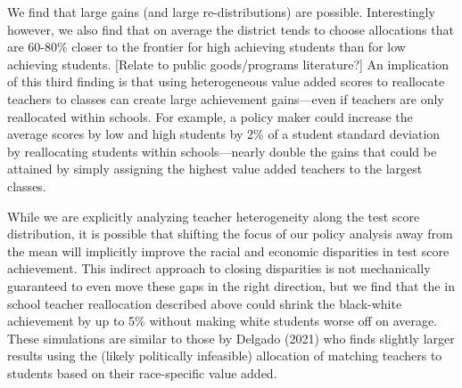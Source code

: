 \documentclass[letterpaper,12pt]{article}
\begin{document}
We find that large gains (and large re-distributions) are possible. Interestingly however, we also find that on average the district tends to choose allocations that are 60-80\% closer to the frontier for high achieving students than for low achieving students. [Relate to public goods/programs literature?] An implication of this third finding is that using heterogeneous value added scores to reallocate teachers to classes can create large achievement gains—even if teachers are only reallocated within schools. For example, a policy maker could increase the average scores by low and high students by 2\% of a student standard deviation by reallocating students within schools—nearly double the gains that could be attained by simply assigning the highest value added teachers to the largest classes. 

While we are explicitly analyzing teacher heterogeneity along the test score distribution, it is possible that shifting the focus of our policy analysis away from the mean will implicitly improve the racial and economic disparities in test score achievement. This indirect approach to closing disparities is not mechanically guaranteed to even move these gaps in the right direction, but we find that the in school teacher reallocation described above could shrink the black-white achievement by up to 5\% without making white students worse off on average. These simulations are similar to those by Delgado (2021) who finds slightly larger results using the (likely politically infeasible) allocation of matching teachers to students based on their race-specific value added.




\end{document}
